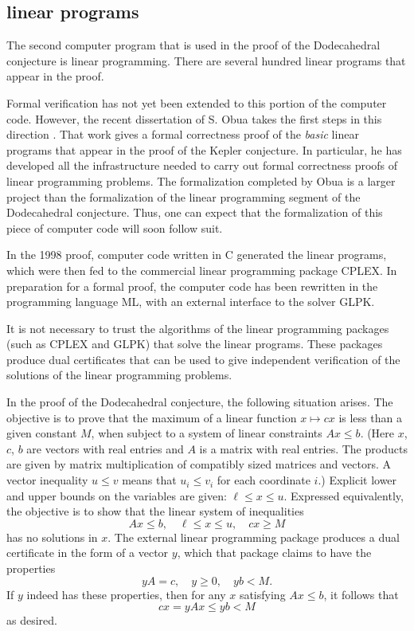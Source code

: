\documentclass{article} %
\begin{document}

\subsection{linear programs}

The second computer 
program that is used in the proof of the Dodecahedral
conjecture is linear programming.  There are several hundred
linear programs that appear in the proof.

Formal verification has not yet been extended to this portion
of the computer code.  However, the recent dissertation of
S. Obua takes the first steps in this direction \cite{Ob}.
That work gives a formal correctness proof of the {\it basic} linear
programs that appear in the proof of the Kepler conjecture.
In particular, he has developed all the infrastructure needed to
carry out formal correctness proofs of linear programming problems.
The formalization  completed by Obua is a larger project than the
formalization of the linear programming segment of the Dodecahedral
conjecture.
Thus, one can expect that the formalization of this piece of
computer code  will soon follow suit.

In the 1998 proof, computer code written in C  generated 
the linear programs, which were then fed to the 
commercial linear programming
package CPLEX.  In preparation for a formal proof, the computer
code has been rewritten in the programming language ML, with
an external interface to the solver GLPK.

It is not necessary to trust the algorithms of the
linear programming packages (such as CPLEX and GLPK) that solve
the linear programs.  These packages produce dual certificates that
can be used to give independent verification of the solutions
of the linear programming problems.

In the proof of the Dodecahedral conjecture,   the
following situation arises.  The objective is 
to prove that the maximum of a
linear function 
$x\mapsto c x$ is less than a given constant $M$, when subject
to a system of linear constraints $A x \le b$.  (Here $x$, $c$, $b$
are vectors with real entries and $A$ is a matrix with real
entries.  The products are given by matrix multiplication of compatibly sized matrices and vectors. 
A vector inequality $u\le v$
means that $u_i \le v_i$ for each coordinate $i$.) 
Explicit lower and upper bounds on the variables
are given: $\ell \le x \le u$.
Expressed equivalently, the objective is to show that the linear 
system of inequalities
  $$
  A x \le b,\quad \ell \le x\le u,\quad c x \ge M
  $$
has no solutions in $x$.
The external linear programming package produces a dual certificate
in the form of a vector $y$, which that package claims to have
the properties 
  \begin{equation}
  y A = c,\quad y\ge 0,\quad y b < M.
  \end{equation}
If $y$ indeed has these properties, then for any $x$ satisfying
$A x \le b$, it follows that
   \begin{equation}\label{eqn:cxM}
   c x = y A x \le y b < M
   \end{equation}
as desired.
\end{document}
